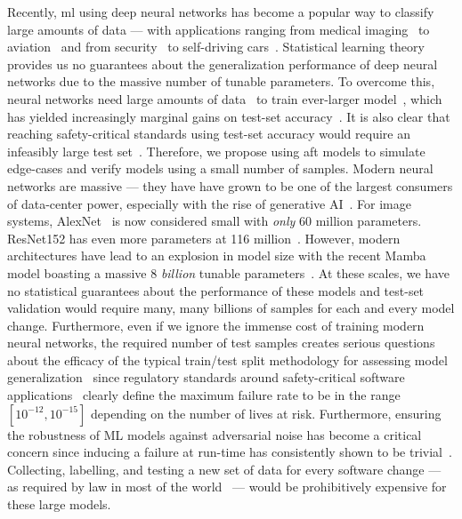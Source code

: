 \documentclass[sn-mathphys-num]{sn-jnl}%
\begin{document}
Recently, \acrfull{ml} using deep neural networks has become a popular way to classify large amounts of data --- with applications ranging from medical imaging~\cite{ai_medical_imaging} to aviation~\cite{ai_aviation} and from security~\cite{ai_security,ai_luggage,ai_prison} to self-driving cars~\cite{ai_automotive}.
Statistical learning theory~\cite{vcdimension,shalev2014understanding} provides us no guarantees about the generalization performance of deep neural networks due to the massive number of tunable parameters. 
To overcome this, neural networks need large amounts of data~\cite{desislavov2021compute,bailly2022effects} to train ever-larger model~\cite{desislavov2021compute}, which has yielded increasingly marginal gains on test-set accuracy~\cite{sun2017revisiting}.
It is also clear that reaching safety-critical standards using test-set accuracy would require an infeasibly large test set~\cite{meyers}. 
Therefore, we propose using \acrfull{aft} models to simulate edge-cases and verify models using a small number of samples.
Modern neural networks are massive --- they have have grown to be one of the largest consumers of data-center power, especially with the rise of generative AI~\cite{msft_water}. 
For image systems, AlexNet~\cite{alom2018history} is now considered small with \textit{only} 60 million parameters. 
ResNet152 has even more parameters at 116 million~\cite{resnet}. 
However, modern architectures have lead to an explosion in model size with the recent Mamba model boasting a massive 8 \textit{billion} tunable parameters~\cite{mamba}. At these scales, we have no statistical guarantees about the performance of these models and test-set validation would require many, many billions of samples for each and every model change. 
Furthermore, even if we ignore the immense cost of training modern neural networks, the required number of test samples creates serious questions about the efficacy of the typical train/test split methodology for assessing model generalization~\cite{meyers} since regulatory standards around safety-critical software applications~\cite{IEC61508,iso26262,aviation_software,safetyframework} clearly define the maximum failure rate to be in the range $[10^{-12}, 10^{-15}]$ depending on the number of lives at risk. 
Furthermore, ensuring the robustness of ML models against adversarial noise has become a critical concern since inducing a failure at run-time has consistently shown to be trivial~\cite{adversarialpatch,carlini_towards_2017,croce_reliable_2020,hopskipjump,chakraborty2018adversarial,art2018}. Collecting, labelling, and testing a new set of data for every software change --- as required by law in most of the world~\cite{IEC61508,iso26262,aviation_software,safetyframework} --- would be prohibitively expensive for these large models. 
\end{document}
